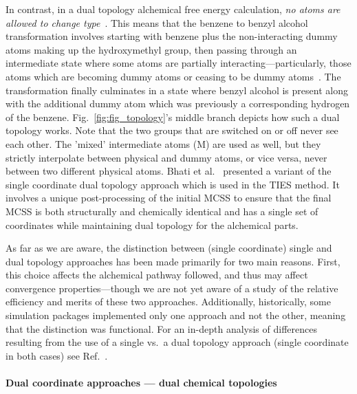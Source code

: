 \documentclass[9pt,bestpractices]{livecoms}
\newcommand{\sbnote}[1]{%
  {\bfseries{}[SB: }%
  {\textcolor{blue}{#1}}{\bfseries{}]}
}
\begin{document}
In contrast, in a dual topology alchemical free energy calculation, \emph{no atoms are allowed to change type}~\cite{boresch1999role, shirts2012best}. This means that the benzene to benzyl alcohol transformation involves starting with benzene plus the non-interacting dummy atoms making up the hydroxymethyl group, then passing through an intermediate state where some atoms are partially interacting---particularly, those atoms which are becoming dummy atoms or ceasing to be dummy atoms~\cite{mobley2014blind}. The transformation finally culminates in a state where benzyl alcohol is present along with the additional dummy atom which was previously a corresponding hydrogen of the benzene. Fig.~\ref{fig:fig_topology}'s middle branch depicts how such a dual topology works. Note that the two groups that are switched on or off never see each other. The 'mixed' intermediate atoms (M) are used as well, but they strictly interpolate between physical and dummy atoms, or vice versa, never between two different physical atoms.
Bhati et al.~\cite{bhati2017, bieniek2021} presented a variant of the single coordinate dual topology approach which is used in the TIES method. It involves a unique post-processing of the initial MCSS to ensure that the final MCSS is both structurally and chemically identical and has a single set of coordinates while maintaining dual topology for the alchemical parts.

As far as we are aware, the distinction between (single coordinate) single and dual topology approaches has been made primarily for two main reasons. First, this choice affects the alchemical pathway followed, and thus may affect convergence properties---though we are not yet aware of a study of the relative efficiency and merits of these two approaches. Additionally, historically, some simulation packages implemented only one approach and not the other, meaning that the distinction was functional. For an in-depth analysis of differences resulting from the use of a  single vs.\ a dual topology approach (single coordinate in both cases) see Ref.~\cite{Boresch_2002}.

\paragraph{Dual coordinate approaches --- dual chemical topologies}
\end{document}
